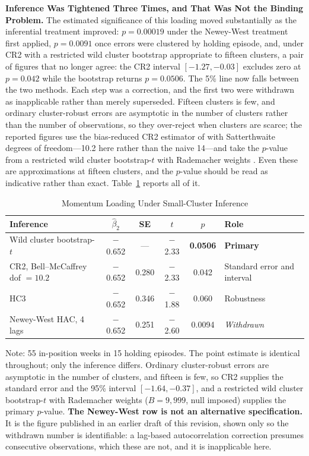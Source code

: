 \documentclass[11pt]{article}
\begin{document}
\textbf{Inference Was Tightened Three Times, and That Was Not the Binding Problem.} The estimated significance of this loading moved substantially as the inferential treatment improved: $p = 0.00019$ under the Newey-West treatment first applied, $p = 0.0091$ once errors were clustered by holding episode, and, under CR2 with a restricted wild cluster bootstrap appropriate to fifteen clusters, a pair of figures that no longer agree: the CR2 interval $[-1.27, -0.03]$ excludes zero at $p = 0.042$ while the bootstrap returns $p = 0.0506$. The 5\% line now falls between the two methods. Each step was a correction, and the first two were withdrawn as inapplicable rather than merely superseded. Fifteen clusters is few, and ordinary cluster-robust errors are asymptotic in the number of clusters rather than the number of observations, so they over-reject when clusters are scarce; the reported figures use the bias-reduced CR2 estimator of \citet{bell2002bias} with Satterthwaite degrees of freedom---10.2 here rather than the naive 14---and take the $p$-value from a restricted wild cluster bootstrap-$t$ with Rademacher weights \citep{cameron2008bootstrap}. Even these are approximations at fifteen clusters, and the $p$-value should be read as indicative rather than exact. Table~\ref{tab:sevariants} reports all of it.

\begin{table}[H]
\centering
\caption{Momentum Loading Under Small-Cluster Inference}
\label{tab:sevariants}
\small
\begin{tabular}{@{}lccccl@{}}
\toprule
Inference & $\hat{\beta}_2$ & SE & $t$ & $p$ & Role \\
\midrule
Wild cluster bootstrap-$t$ & $-$0.652 & --- & $-$2.33 & \textbf{0.0506} & \textbf{Primary} \\
CR2, Bell--McCaffrey dof $= 10.2$ & $-$0.652 & 0.280 & $-$2.33 & 0.042 & Standard error and interval \\
HC3 & $-$0.652 & 0.346 & $-$1.88 & 0.060 & Robustness \\
\midrule
Newey-West HAC, 4 lags & $-$0.652 & 0.251 & $-$2.60 & 0.0094 & \emph{Withdrawn} \\
\bottomrule
\end{tabular}
\par\vspace{0.3em}
\parbox{\linewidth}{\footnotesize Note: 55 in-position weeks in 15 holding episodes. The point estimate is identical throughout; only the inference differs. Ordinary cluster-robust errors are asymptotic in the number of clusters, and fifteen is few, so CR2 supplies the standard error and the 95\% interval $[-1.64, -0.37]$, and a restricted wild cluster bootstrap-$t$ with Rademacher weights ($B = 9{,}999$, null imposed) supplies the primary $p$-value. \textbf{The Newey-West row is not an alternative specification.} It is the figure published in an earlier draft of this revision, shown only so the withdrawn number is identifiable: a lag-based autocorrelation correction presumes consecutive observations, which these are not, and it is inapplicable here.}
\end{table}
\end{document}
